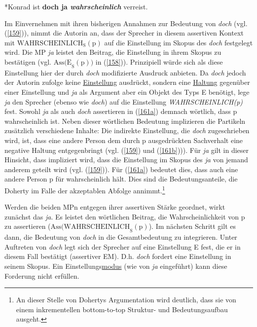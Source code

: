 \begin{exe}
	\ex\label{162} 
		*Konrad ist \textbf{doch ja \textit{wahrscheinlich}} verreist.
\end{exe}      
Im Einvernehmen mit ihren bisherigen Annahmen zur Bedeutung von \textit{doch} (vgl. (\ref{159})), nimmt die Autorin an, dass der Sprecher in diesem assertiven Kontext mit $\textrm{WAHRSCHEINLICH}_{\textrm{S}}(\textrm{p})$ auf die Einstellung im Skopus des \textit{doch} festgelegt wird. Die MP \textit{ja} leistet den Beitrag, die Einstellung in ihrem Skopus zu bestätigen (vgl. $\textrm{Ass(E}_{\textrm{S}}(\textrm{p}))$ in (\ref{158})). Prinzipiell würde sich als diese Einstellung hier der durch \textit{doch} modifizierte Ausdruck anbieten. Da \textit{doch} jedoch der Autorin zufolge keine \underline{Einstellung} ausdrückt, sondern eine \underline{Haltung} gegenüber einer Einstellung und \textit{ja} als Argument aber ein Objekt des Typs E benötigt, lege \textit{ja} den Sprecher (ebenso wie \textit{doch}) auf die Einstellung \textit{WAHRSCHEINLICH(p)} fest. Sowohl \textit{ja} als auch \textit{doch} assertieren in (\ref{161a}) demnach wörtlich, dass p wahrscheinlich ist. Neben dieser wörtlichen Bedeutung implizieren die Partikeln zusätzlich verschie\-dene Inhalte: Die indirekte Einstellung, die \textit{doch} zugeschrieben wird, ist, dass eine andere Person dem durch p ausgedrückten Sachverhalt eine negative Haltung entgegenbringt (vgl. (\ref{159}) und (\ref{161b}))). Für \textit{ja} gilt in dieser Hinsicht, dass impliziert wird, dass die Einstellung im Skopus des \textit{ja} von jemand anderem geteilt wird (vgl. (\ref{159})). Für (\ref{161a}) bedeutet dies, dass auch eine andere Person p für wahrscheinlich hält. Dies sind die Bedeutungsanteile, die Doherty im Falle der akzeptablen Abfolge annimmt.\footnote{An dieser Stelle von Dohertys Argumentation wird deutlich, dass sie von einem inkrementellen bottom-to-top Struktur- und Bedeutungsaufbau ausgeht.}

Werden die beiden MPn entgegen ihrer assertiven Stärke geordnet, wirkt zu\-nächst das \textit{ja}. Es leistet den wörtlichen Beitrag, die Wahrscheinlichkeit von p zu assertieren ($\textrm{Ass(WAHRSCHEINLICH}_{\textrm{S}}(\textrm{p})$). Im nächsten Schritt gilt es dann, die Bedeutung von \textit{doch} in die Gesamtbedeutung zu integrieren. Unter Auftreten von \textit{doch} legt sich der Sprecher auf eine Einstellung E fest, die er in diesem Fall bestätigt (assertiver EM). D.h. \textit{doch} fordert eine Einstellung in seinem Skopus. Ein Einstellungs\underline{modus} (wie von \textit{ja} eingeführt) kann diese Forderung nicht erfüllen. 

